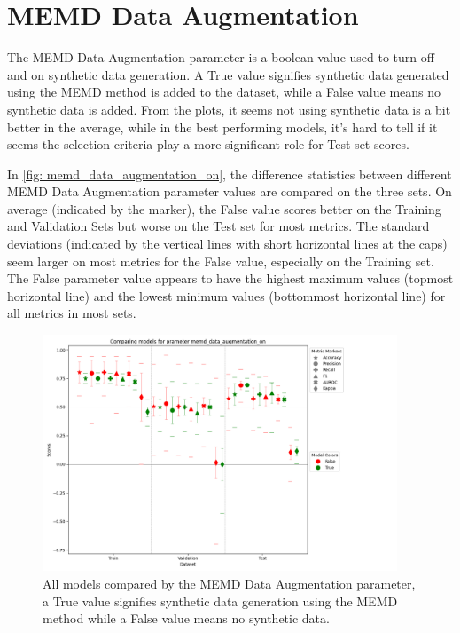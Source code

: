 \section{MEMD Data Augmentation}
\label{res_sec: memd_data_aug}
The MEMD Data Augmentation parameter is a boolean value used to turn off and on synthetic data generation. A True value signifies synthetic data generated using the MEMD method is added to the dataset, while a False value means no synthetic data is added. From the plots, it seems not using synthetic data is a bit better in the average, while in the best performing models, it's hard to tell if it seems the selection criteria play a more significant role for Test set scores.

In \autoref{fig: memd_data_augmentation_on}, the difference statistics between different MEMD Data Augmentation parameter values are compared on the three sets. On average (indicated by the marker), the False value scores better on the Training and Validation Sets but worse on the Test set for most metrics. The standard deviations (indicated by the vertical lines with short horizontal lines at the caps) seem larger on most metrics for the False value, especially on the Training set. The False parameter value appears to have the highest maximum values (topmost horizontal line) and the lowest minimum values (bottommost horizontal line) for all metrics in most sets.

\begin{figure}[H]
    \centering
    \includegraphics[width=400px]{Figures/results/memd_data_augmentation_on/memd_data_augmentation_on.png}
    \caption{All models compared by the MEMD Data Augmentation parameter, a True value signifies synthetic data generation using the MEMD method while a False value means no synthetic data.}
    \label{fig: memd_data_augmentation_on}
\end{figure}


